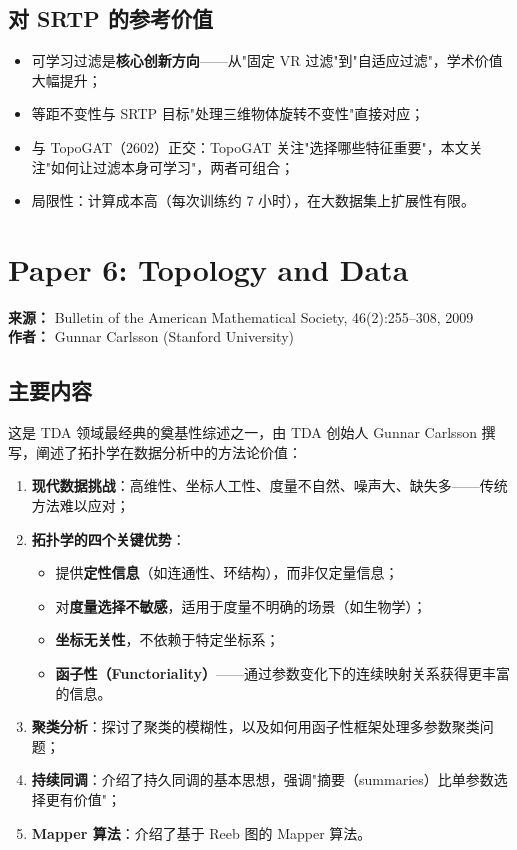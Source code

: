 \documentclass[11pt,a4paper]{article}
\begin{document}
\subsection*{对 SRTP 的参考价值}
\begin{itemize}[nosep]
  \item 可学习过滤是\textbf{核心创新方向}——从"固定 VR 过滤"到"自适应过滤"，学术价值大幅提升；
  \item 等距不变性与 SRTP 目标"处理三维物体旋转不变性"直接对应；
  \item 与 TopoGAT（2602）正交：TopoGAT 关注"选择哪些特征重要"，本文关注"如何让过滤本身可学习"，两者可组合；
  \item 局限性：计算成本高（每次训练约 7 小时），在大数据集上扩展性有限。
\end{itemize}


\section{Paper 6: Topology and Data}

\textbf{来源：} Bulletin of the American Mathematical Society, 46(2):255–308, 2009 \\
\textbf{作者：} Gunnar Carlsson (Stanford University)

\subsection*{主要内容}
这是 TDA 领域最经典的奠基性综述之一，由 TDA 创始人 Gunnar Carlsson 撰写，阐述了拓扑学在数据分析中的方法论价值：

\begin{enumerate}[nosep]
  \item \textbf{现代数据挑战}：高维性、坐标人工性、度量不自然、噪声大、缺失多——传统方法难以应对；
  \item \textbf{拓扑学的四个关键优势}：
    \begin{itemize}[nosep]
      \item 提供\textbf{定性信息}（如连通性、环结构），而非仅定量信息；
      \item 对\textbf{度量选择不敏感}，适用于度量不明确的场景（如生物学）；
      \item \textbf{坐标无关性}，不依赖于特定坐标系；
      \item \textbf{函子性（Functoriality）}——通过参数变化下的连续映射关系获得更丰富的信息。
    \end{itemize}
  \item \textbf{聚类分析}：探讨了聚类的模糊性，以及如何用函子性框架处理多参数聚类问题；
  \item \textbf{持续同调}：介绍了持久同调的基本思想，强调"摘要（summaries）比单参数选择更有价值"；
  \item \textbf{Mapper 算法}：介绍了基于 Reeb 图的 Mapper 算法。
\end{enumerate}
\end{document}
